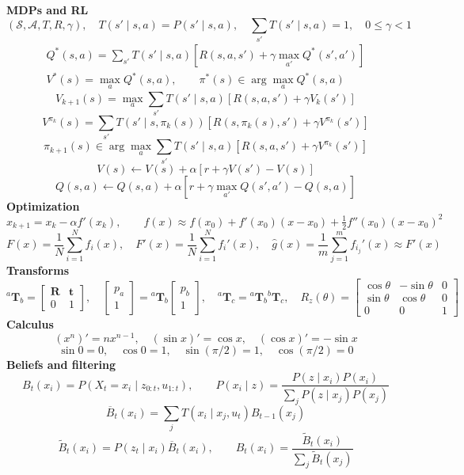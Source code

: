 \documentclass[11pt]{article}
\newcommand{\actspace}{\mathcal{A}}     %
\newcommand{\Sset}{\mathcal{S}}         %
\newcommand{\rot}{\mathbf{R}}           %
\newcommand{\tra}{\mathbf{t}}           %
\newcommand{\Tf}[2]{{}^{#1}\mathbf{T}_{#2}}  %
\begin{document}
\textbf{MDPs and RL}
\[
 (\Sset,\actspace,T,R,\gamma),\quad T(s'\mid s,a)=P(s'\mid s,a),\quad
 \sum_{s'}T(s'\mid s,a)=1,\quad 0\le\gamma<1
\]
\[
 \begin{gathered}
 Q^*(s,a)=\sum_{s'}T(s'\mid s,a)
 [R(s,a,s')+\gamma\max_{a'}Q^*(s',a')]\\[4pt]
 V^*(s)=\max_a Q^*(s,a),\qquad
 \pi^*(s)\in\arg\max_a Q^*(s,a)
 \end{gathered}
\]
\[
 V_{k+1}(s)=\max_a\sum_{s'}T(s'\mid s,a)[R(s,a,s')+\gamma V_k(s')]
\]
\[
 V^{\pi_k}(s)=\sum_{s'}T(s'\mid s,\pi_k(s))
 [R(s,\pi_k(s),s')+\gamma V^{\pi_k}(s')]
\]
\[
 \pi_{k+1}(s)\in\arg\max_a\sum_{s'}T(s'\mid s,a)[R(s,a,s')+\gamma V^{\pi_k}(s')]
\]
\[
 V(s)\leftarrow V(s)+\alpha[r+\gamma V(s')-V(s)]
\]
\[
 Q(s,a)\leftarrow Q(s,a)+\alpha[r+\gamma\max_{a'}Q(s',a')-Q(s,a)]
\]
\textbf{Optimization}
\[
 x_{k+1}=x_k-\alpha f'(x_k),\qquad
 f(x)\approx f(x_0)+f'(x_0)(x-x_0)+\tfrac12 f''(x_0)(x-x_0)^2
\]
\[
 F(x)=\frac1N\sum_{i=1}^N f_i(x),\quad
 F'(x)=\frac1N\sum_{i=1}^N f_i'(x),\quad
 \widehat g(x)=\frac1m\sum_{j=1}^m f_{i_j}'(x)\approx F'(x)
\]
\textbf{Transforms}
\[
 \Tf{a}{b}=\begin{bmatrix}\rot&\tra\\0&1\end{bmatrix},\quad
 \begin{bmatrix}p_a\\1\end{bmatrix}=\Tf{a}{b}\begin{bmatrix}p_b\\1\end{bmatrix},\quad
 \Tf{a}{c}=\Tf{a}{b}\Tf{b}{c},\quad
 R_z(\theta)=\begin{bmatrix}\cos\theta&-\sin\theta&0\\\sin\theta&\cos\theta&0\\0&0&1\end{bmatrix}
\]
\textbf{Calculus}
\[
 (x^n)'=nx^{n-1},\quad(\sin x)'=\cos x,\quad(\cos x)'=-\sin x
\]
\[
 \sin0=0,\quad\cos0=1,\quad\sin(\pi/2)=1,\quad\cos(\pi/2)=0
\]
\textbf{Beliefs and filtering}
\[
 B_t(x_i)=P(X_t=x_i\mid z_{0:t},u_{1:t}),\qquad
 P(x_i\mid z)=\frac{P(z\mid x_i)P(x_i)}
 {\sum_jP(z\mid x_j)P(x_j)}
\]
\[
 \overline B_t(x_i)=\sum_j T(x_i\mid x_j,u_t)B_{t-1}(x_j)
\]
\[
 \widetilde B_t(x_i)=P(z_t\mid x_i)\overline B_t(x_i),\qquad
 B_t(x_i)=\frac{\widetilde B_t(x_i)}{\sum_j\widetilde B_t(x_j)}
\]
\endgroup

\clearpage
\fi
\end{document}
